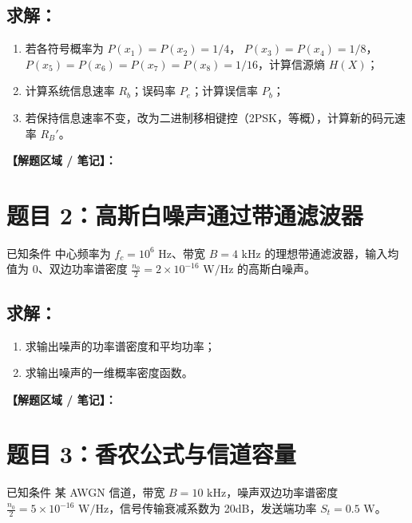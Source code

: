 \documentclass[12pt, a4paper]{article}
\begin{document}
	\subsection*{求解：}
	\begin{enumerate}[label=(\arabic*)]
		\item 若各符号概率为 $P(x_1)=P(x_2)=1/4$， $P(x_3)=P(x_4)=1/8$， $P(x_5)=P(x_6)=P(x_7)=P(x_8)=1/16$，计算信源熵 $H(X)$；
		\item 计算系统信息速率 $R_b$；误码率 $P_e$；计算误信率 $P_b$；
		\item 若保持信息速率不变，改为二进制移相键控（2PSK，等概），计算新的码元速率 $R_B'$。
	\end{enumerate}
	
	\noindent\textbf{【解题区域 / 笔记】：}
	
	\newpage
	
	\section*{题目 2：高斯白噪声通过带通滤波器}
	
	\begin{problembox}{已知条件}
		中心频率为 $f_c=10^6 \text{ Hz}$、带宽 $B=4 \text{ kHz}$ 的理想带通滤波器，输入均值为 0、双边功率谱密度 $\frac{n_0}{2} = 2 \times 10^{-16} \text{ W/Hz}$ 的高斯白噪声。
	\end{problembox}
	
	\subsection*{求解：}
	\begin{enumerate}[label=(\arabic*)]
		\item 求输出噪声的功率谱密度和平均功率；
		\item 求输出噪声的一维概率密度函数。
	\end{enumerate}
	
	\noindent\textbf{【解题区域 / 笔记】：}
	
	\newpage
	
	\section*{题目 3：香农公式与信道容量}
	
	\begin{problembox}{已知条件}
		某 AWGN 信道，带宽 $B=10 \text{ kHz}$，噪声双边功率谱密度 $\frac{n_0}{2} = 5 \times 10^{-16} \text{ W/Hz}$，信号传输衰减系数为 20dB，发送端功率 $S_t=0.5 \text{ W}$。
	\end{problembox}
	
\end{document}
